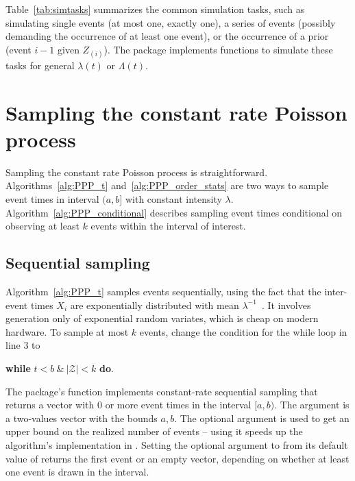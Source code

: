 \documentclass[article,nojss]{jss}\usepackage[]{graphicx}\usepackage[]{xcolor}
\newcommand{\fct}[1]{\code{#1()}}
\begin{document}
Table~\ref{tab:simtasks} summarizes the common simulation tasks, such as simulating single events (at most one, exactly one), a series of events (possibly demanding the occurrence of at least one event), or the occurrence of a prior (event $i-1$ given $Z_{(i)}$). The  package implements functions to simulate these tasks for general $\lambda(t)$ or $\Lambda(t)$.



\section{Sampling the constant rate Poisson process}\label{sec:sample-ppp}

Sampling the constant rate Poisson process is straightforward. Algorithms~\ref{alg:PPP_t} and~\ref{alg:PPP_order_stats} are two ways to sample event times in interval $(a, b]$ with constant intensity $\lambda$. Algorithm~\ref{alg:PPP_conditional} describes sampling event times conditional on observing at least $k$ events within the interval of interest.

\newpage
\subsection{Sequential sampling}\label{sec:PPP_t}

Algorithm~\ref{alg:PPP_t} samples events sequentially, using the fact that the inter-event times $X_i$ are exponentially distributed with mean $\lambda^{-1}$~\citep[par. 4.1]{cox1965theory}. It involves generation only of exponential random variates, which is cheap on modern hardware. To sample at most $k$ events, change the condition for the while loop in line 3 to
\begin{center}
\textbf{while} {$t <b  \ \& \  |\mathcal{Z}| < k$} \textbf{do}.
\end{center}



The package's \fct{ppp\_sequential} function implements constant-rate sequential sampling that returns a vector with 0 or more event times in the interval $[a, b)$. The  argument is a two-values vector with the bounds $a, b$. The optional  argument is used to get an upper bound on the realized number of events -- using it speeds up the algorithm's implementation in . Setting the optional argument  to  from its default value of  returns the first event or an empty vector, depending on whether at least one event is drawn in the interval.
\end{document}
